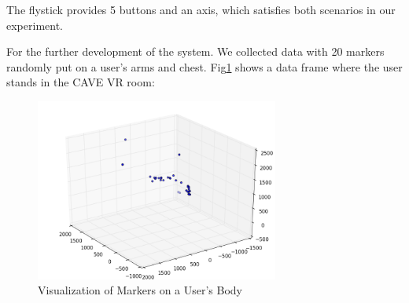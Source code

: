 The flystick provides 5 buttons and an axis, which satisfies both
scenarios in our experiment.

For the further development of the system. We collected data with
20 markers randomly put on a user's arms and
chest. Fig\ref{fig:markers} shows a data frame where the user stands
in the CAVE VR room:

\begin{figure}[!ht]
  \centering
  \includegraphics[width=8cm]{figures/markers.png}
  \caption{Visualization of Markers on a User's Body}
  \label{fig:markers}
\end{figure}



